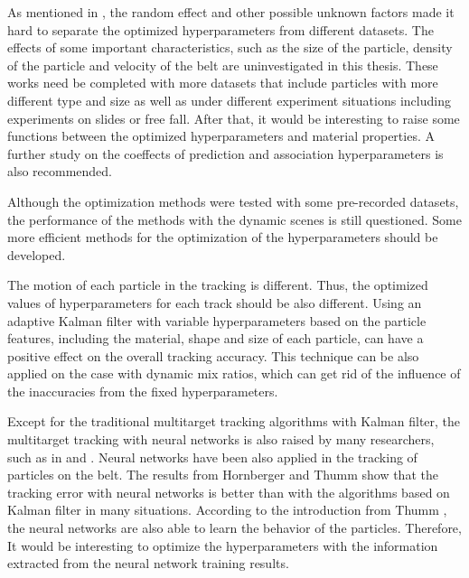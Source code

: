As mentioned in , the random effect and other possible unknown factors made it hard to separate the optimized hyperparameters from different datasets. The effects of some important characteristics, such as the size of the particle, density of the particle and velocity of the belt are uninvestigated in this thesis. These works need be completed with more datasets that include particles with more different type and size as well as under different experiment situations including experiments on slides or free fall. After that, it would be interesting to raise some functions between the optimized hyperparameters and material properties. A further study on the coeffects of prediction and association hyperparameters is also recommended.

Although the optimization methods were tested with some pre-recorded datasets, the performance of the methods with the dynamic scenes is still questioned. Some more efficient methods for the optimization of the hyperparameters should be developed. 

The motion of each particle in the tracking is different. Thus, the optimized values of hyperparameters for each track should be also different. Using an adaptive Kalman filter with variable hyperparameters based on the particle features, including the material, shape and size of each particle, can have a positive effect on the overall tracking accuracy. This technique can be also applied on the case with dynamic mix ratios, which can get rid of the influence of the inaccuracies from the fixed hyperparameters.

Except for the traditional multitarget tracking algorithms with Kalman filter, the multitarget tracking with neural networks is also raised by many researchers, such as in \cite{milan2016online} and \cite{wang2017survey}. Neural networks have been also applied in the tracking of particles on the belt. The results from Hornberger \cite{hornberger2018} and Thumm \cite{thumm2020} show that the tracking error with neural networks is better than with the algorithms based on Kalman filter in many situations. According to the introduction from Thumm \cite{thumm2020}, the neural networks are also able to learn the behavior of the particles. Therefore, It would be interesting to optimize the hyperparameters with the information extracted from the neural network training results.




